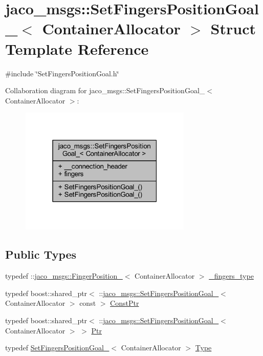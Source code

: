 \hypertarget{structjaco__msgs_1_1SetFingersPositionGoal__}{}\section{jaco\+\_\+msgs\+:\+:Set\+Fingers\+Position\+Goal\+\_\+$<$ Container\+Allocator $>$ Struct Template Reference}
\label{structjaco__msgs_1_1SetFingersPositionGoal__}


{\ttfamily \#include \char`\"{}Set\+Fingers\+Position\+Goal.\+h\char`\"{}}



Collaboration diagram for jaco\+\_\+msgs\+:\+:Set\+Fingers\+Position\+Goal\+\_\+$<$ Container\+Allocator $>$\+:
\nopagebreak
\begin{figure}[H]
\begin{center}
\leavevmode
\includegraphics[width=232pt]{d2/d45/structjaco__msgs_1_1SetFingersPositionGoal____coll__graph}
\end{center}
\end{figure}
\subsection*{Public Types}
\begin{DoxyCompactItemize}
\item 
typedef \+::\hyperlink{structjaco__msgs_1_1FingerPosition__}{jaco\+\_\+msgs\+::\+Finger\+Position\+\_\+}$<$ Container\+Allocator $>$ \hyperlink{structjaco__msgs_1_1SetFingersPositionGoal___abb2ddc1ec460839d7bcbc60fec63f463}{\+\_\+fingers\+\_\+type}
\item 
typedef boost\+::shared\+\_\+ptr$<$ \+::\hyperlink{structjaco__msgs_1_1SetFingersPositionGoal__}{jaco\+\_\+msgs\+::\+Set\+Fingers\+Position\+Goal\+\_\+}$<$ Container\+Allocator $>$ const  $>$ \hyperlink{structjaco__msgs_1_1SetFingersPositionGoal___a8bb24530dbb610aea679ddf6e7d7b08f}{Const\+Ptr}
\item 
typedef boost\+::shared\+\_\+ptr$<$ \+::\hyperlink{structjaco__msgs_1_1SetFingersPositionGoal__}{jaco\+\_\+msgs\+::\+Set\+Fingers\+Position\+Goal\+\_\+}$<$ Container\+Allocator $>$ $>$ \hyperlink{structjaco__msgs_1_1SetFingersPositionGoal___a2d4e883221fd33df8b2f229e8f7764fe}{Ptr}
\item 
typedef \hyperlink{structjaco__msgs_1_1SetFingersPositionGoal__}{Set\+Fingers\+Position\+Goal\+\_\+}$<$ Container\+Allocator $>$ \hyperlink{structjaco__msgs_1_1SetFingersPositionGoal___ae390fc3ba8bfd6d26c0606be811db085}{Type}
\end{DoxyCompactItemize}
